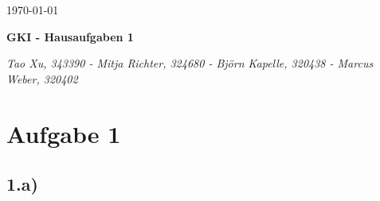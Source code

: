 \documentclass[a4paper]{article}
\begin{document}
  \begin{flushright}
    \today
  \end{flushright}
  \begin{center}
    \Large\textbf{{GKI - Hausaufgaben 1}}\\
  \end{center}

  \begin{center}
        \large\textsl{Tao Xu, 343390 - Mitja Richter, 324680 - Björn Kapelle, 320438 - Marcus Weber, 320402}\\
  \end{center}


\section*{Aufgabe 1}
\subsection*{1.a)}
\end{document}

